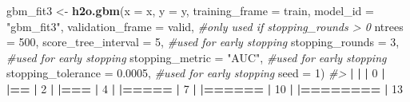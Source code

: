 \documentclass[]{book}
\newenvironment{Shaded}{\begin{snugshade}}{\end{snugshade}}
\newcommand{\CommentTok}[1]{\textcolor[rgb]{0.56,0.35,0.01}{\textit{#1}}}
\newcommand{\DataTypeTok}[1]{\textcolor[rgb]{0.13,0.29,0.53}{#1}}
\newcommand{\DecValTok}[1]{\textcolor[rgb]{0.00,0.00,0.81}{#1}}
\newcommand{\ErrorTok}[1]{\textcolor[rgb]{0.64,0.00,0.00}{\textbf{#1}}}
\newcommand{\FloatTok}[1]{\textcolor[rgb]{0.00,0.00,0.81}{#1}}
\newcommand{\KeywordTok}[1]{\textcolor[rgb]{0.13,0.29,0.53}{\textbf{#1}}}
\newcommand{\NormalTok}[1]{#1}
\newcommand{\OperatorTok}[1]{\textcolor[rgb]{0.81,0.36,0.00}{\textbf{#1}}}
\newcommand{\StringTok}[1]{\textcolor[rgb]{0.31,0.60,0.02}{#1}}
\begin{document}
\begin{Shaded}
\begin{Highlighting}[]
\NormalTok{gbm_fit3 <-}\StringTok{ }\KeywordTok{h2o.gbm}\NormalTok{(}\DataTypeTok{x =}\NormalTok{ x,}
                    \DataTypeTok{y =}\NormalTok{ y,}
                    \DataTypeTok{training_frame =}\NormalTok{ train,}
                    \DataTypeTok{model_id =} \StringTok{"gbm_fit3"}\NormalTok{,}
                    \DataTypeTok{validation_frame =}\NormalTok{ valid,  }\CommentTok{#only used if stopping_rounds > 0}
                    \DataTypeTok{ntrees =} \DecValTok{500}\NormalTok{,}
                    \DataTypeTok{score_tree_interval =} \DecValTok{5}\NormalTok{,      }\CommentTok{#used for early stopping}
                    \DataTypeTok{stopping_rounds =} \DecValTok{3}\NormalTok{,          }\CommentTok{#used for early stopping}
                    \DataTypeTok{stopping_metric =} \StringTok{"AUC"}\NormalTok{,      }\CommentTok{#used for early stopping}
                    \DataTypeTok{stopping_tolerance =} \FloatTok{0.0005}\NormalTok{,  }\CommentTok{#used for early stopping}
                    \DataTypeTok{seed =} \DecValTok{1}\NormalTok{)}
\CommentTok{#> }
  \OperatorTok{|}\StringTok{                                                                       }
\StringTok{  }\ErrorTok{|}\StringTok{                                                                 }\ErrorTok{|}\StringTok{   }\DecValTok{0}\NormalTok{%}
  \OperatorTok{|}\StringTok{                                                                       }
\StringTok{  }\ErrorTok{|==}\StringTok{                                                               }\ErrorTok{|}\StringTok{   }\DecValTok{2}\NormalTok{%}
  \OperatorTok{|}\StringTok{                                                                       }
\StringTok{  }\ErrorTok{|===}\StringTok{                                                              }\ErrorTok{|}\StringTok{   }\DecValTok{4}\NormalTok{%}
  \OperatorTok{|}\StringTok{                                                                       }
\StringTok{  }\ErrorTok{|=====}\StringTok{                                                            }\ErrorTok{|}\StringTok{   }\DecValTok{7}\NormalTok{%}
  \OperatorTok{|}\StringTok{                                                                       }
\StringTok{  }\ErrorTok{|======}\StringTok{                                                           }\ErrorTok{|}\StringTok{  }\DecValTok{10}\NormalTok{%}
  \OperatorTok{|}\StringTok{                                                                       }
\StringTok{  }\ErrorTok{|========}\StringTok{                                                         }\ErrorTok{|}\StringTok{  }\DecValTok{13}\NormalTok{%}
}}}}}}
\end{Highlighting}
\end{Shaded}
\end{document}
